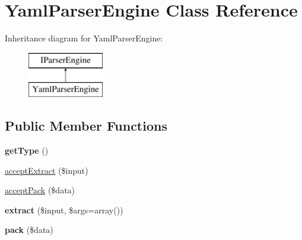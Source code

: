 \hypertarget{class_utopia_1_1_components_1_1_data_parser_1_1_yaml_parser_engine}{
\section{YamlParserEngine Class Reference}
\label{class_utopia_1_1_components_1_1_data_parser_1_1_yaml_parser_engine}
}
Inheritance diagram for YamlParserEngine:\begin{figure}[H]
\begin{center}
\leavevmode
\includegraphics[height=2.000000cm]{class_utopia_1_1_components_1_1_data_parser_1_1_yaml_parser_engine}
\end{center}
\end{figure}
\subsection*{Public Member Functions}
\begin{DoxyCompactItemize}
\item 
\hypertarget{class_utopia_1_1_components_1_1_data_parser_1_1_yaml_parser_engine_a830b5c75df72b32396701bc563fbe3c7}{
{\bfseries getType} ()}
\label{class_utopia_1_1_components_1_1_data_parser_1_1_yaml_parser_engine_a830b5c75df72b32396701bc563fbe3c7}

\item 
\hyperlink{class_utopia_1_1_components_1_1_data_parser_1_1_yaml_parser_engine_aa40a2c570a65e6f8d8a55af28cd6e595}{acceptExtract} (\$input)
\item 
\hyperlink{class_utopia_1_1_components_1_1_data_parser_1_1_yaml_parser_engine_a0e48ec53c3dc0fdc3918ca54041744e7}{acceptPack} (\$data)
\item 
\hypertarget{class_utopia_1_1_components_1_1_data_parser_1_1_yaml_parser_engine_a3dffec125cfe41516f0ae24acdb87901}{
{\bfseries extract} (\$input, \$args=array())}
\label{class_utopia_1_1_components_1_1_data_parser_1_1_yaml_parser_engine_a3dffec125cfe41516f0ae24acdb87901}

\item 
\hypertarget{class_utopia_1_1_components_1_1_data_parser_1_1_yaml_parser_engine_ab1243b982f1390bcc329bcefa5dda6a3}{
{\bfseries pack} (\$data)}
\label{class_utopia_1_1_components_1_1_data_parser_1_1_yaml_parser_engine_ab1243b982f1390bcc329bcefa5dda6a3}

\end{DoxyCompactItemize}


